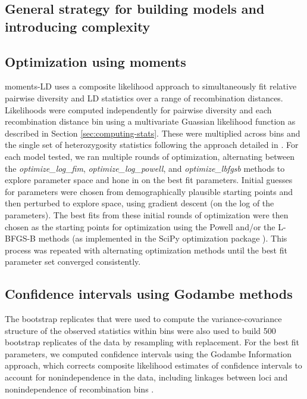 \documentclass[]{article}
\begin{document}
\subsection{General strategy for building models and introducing complexity}

\subsection{Optimization using moments}

moments-LD uses a composite likelihood approach to simultaneously fit relative
pairwise diversity and LD statistics over a range of recombination distances.
Likelihoods were computed independently for pairwise diversity and each
recombination distance bin using a multivariate Guassian likelihood function as
described in Section \ref{sec:computing-stats}. These were multiplied across
bins and the single set of heterozygosity statistics following the approach
detailed in \citet{Ragsdale2019-nt}. For each model tested, we ran multiple
rounds of optimization, alternating between the \emph{optimize\_log\_fim},
\emph{optimize\_log\_powell}, and \emph{optimize\_lbfgsb} methods to explore
parameter space and hone in on the best fit parameters. Initial guesses for
parameters were chosen from demographically plausible starting points and then
perturbed to explore space, using gradient descent (on the log of the
parameters). The best fits from these initial rounds of optimization were then
chosen as the starting points for optimization using the Powell and/or the
L-BFGS-B methods (as implemented in the SciPy optimization package
\cite{Virtanen2020-kr}). This process was repeated with alternating
optimization methods until the best fit parameter set converged consistently.

\subsection{Confidence intervals using Godambe methods}

The bootstrap replicates that were used to compute the variance-covariance
structure of the observed statistics within bins were also used to build 500
bootstrap replicates of the data by resampling with replacement. For the best
fit parameters, we computed confidence intervals using the Godambe Information
approach, which corrects composite likelihood estimates of confidence intervals
to account for nonindependence in the data, including linkages between loci and
nonindependence of recombination bins \cite{Coffman2016-yq}.
\end{document}
